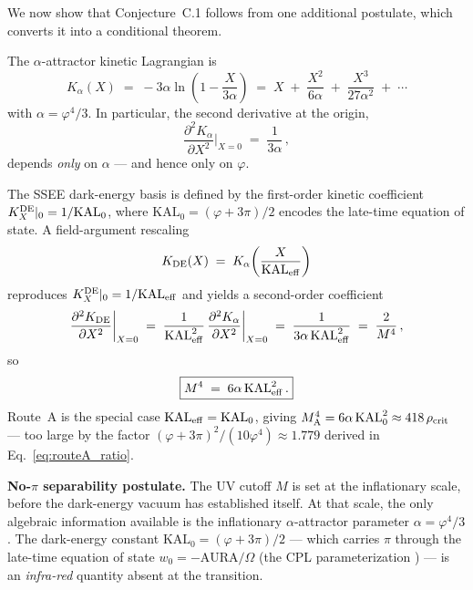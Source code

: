 \documentclass[12pt,a4paper]{article}
\newcommand{\phiG}{\varphi}
\newcommand{\KAL}{\mathrm{KAL}_0}
\newcommand{\KALeff}{\mathrm{KAL}_{\rm eff}}
\renewcommand{\Omega}{\varOmega}
\newcommand{\rhoc}{\rho_{\rm crit}}
\begin{document}
We now show that Conjecture~C.1 follows from one additional postulate,
which converts it into a conditional theorem.

The $\alpha$-attractor kinetic Lagrangian is
\begin{equation}
  K_\alpha(X) \;=\; -3\alpha\ln\!\!\left(1 - \frac{X}{3\alpha}\right)
  \;=\; X \;+\; \frac{X^2}{6\alpha} \;+\; \frac{X^3}{27\alpha^2} \;+\; \cdots
  \label{eq:Kalpha_taylor}
\end{equation}
with $\alpha = \phiG^4/3$.
In particular, the second derivative at the origin,
\begin{equation}
  \frac{\partial^2 K_\alpha}{\partial X^2}\bigg|_{X=0} \;=\; \frac{1}{3\alpha}\,,
  \label{eq:Kalpha_XX}
\end{equation}
depends \emph{only} on $\alpha$ --- and hence only on $\phiG$.

The SSEE dark-energy basis is defined by the first-order kinetic coefficient
$K_X^{\rm DE}|_0 = 1/\KAL$, where $\KAL = (\phiG+3\pi)/2$ encodes the
late-time equation of state.
A field-argument rescaling
\begin{equation}
  K_{\rm DE}(X) \;=\; K_\alpha\!\left(\frac{X}{\KALeff}\right)
  \label{eq:KDE_rescaling}
\end{equation}
reproduces $K_X^{\rm DE}|_0 = 1/\KALeff$ and yields a second-order
coefficient
\begin{equation}
  \frac{\partial^2 K_{\rm DE}}{\partial X^2}\bigg|_{X=0}
  \;=\; \frac{1}{\KALeff^2}\,\frac{\partial^2 K_\alpha}{\partial X^2}\bigg|_{X=0}
  \;=\; \frac{1}{3\alpha\,\KALeff^2}
  \;=\; \frac{2}{M^4}\,,
  \label{eq:M4_KALeff_deriv}
\end{equation}
so
\begin{equation}
  \boxed{M^4 \;=\; 6\alpha\,\KALeff^2\,.}
  \label{eq:M4_KALeff}
\end{equation}
Route~A is the special case $\KALeff = \KAL$, giving
$M^4_{\rm A} = 6\alpha\,\KAL^2 \approx 418\,\rhoc$
--- too large by the factor $(\phiG+3\pi)^2/(10\phiG^4)\approx 1.779$
derived in Eq.~\eqref{eq:routeA_ratio}.

\medskip
\noindent\textbf{No-$\pi$ separability postulate.}
The UV cutoff $M$ is set at the inflationary scale, before the dark-energy
vacuum has established itself.
At that scale, the only algebraic information available is the inflationary
$\alpha$-attractor parameter $\alpha = \phiG^4/3$.
The dark-energy constant $\KAL = (\phiG+3\pi)/2$ --- which carries $\pi$
through the late-time equation of state $w_0 = -\mathrm{AURA}/\Omega$
(the CPL parameterization \citep{ChevallierPolarski2001,Linder2003}) ---
is an \emph{infra-red} quantity absent at the transition.
\end{document}

